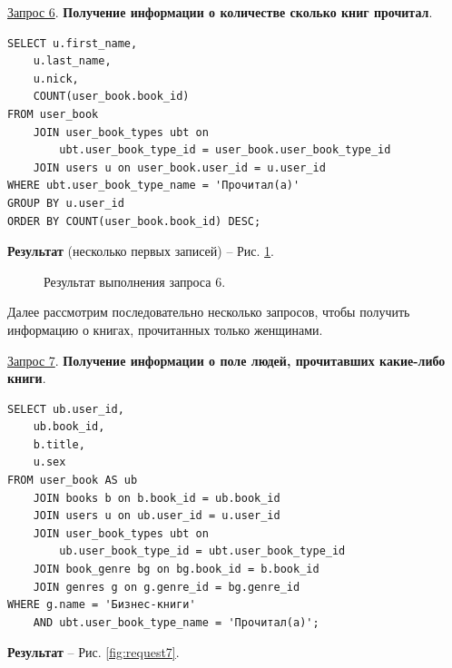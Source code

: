 \documentclass[a4paper,12pt]{article}
\begin{document}
\underline{Запрос 6}. \textbf{Получение информации о количестве сколько книг прочитал}.
\begin{lstlisting}
SELECT u.first_name,
    u.last_name,
    u.nick,
    COUNT(user_book.book_id)
FROM user_book
    JOIN user_book_types ubt on 
        ubt.user_book_type_id = user_book.user_book_type_id
    JOIN users u on user_book.user_id = u.user_id
WHERE ubt.user_book_type_name = 'Прочитал(а)'
GROUP BY u.user_id
ORDER BY COUNT(user_book.book_id) DESC;
    \end{lstlisting}

\textbf{Результат} (несколько первых записей) -- Рис. \ref{fig:request6}.

\begin{figure}[ht]
    \caption{Результат выполнения запроса 6.}
    \label{fig:request6}
\end{figure}

Далее рассмотрим последовательно несколько запросов, чтобы получить информацию о книгах, прочитанных только женщинами.

\underline{Запрос 7}. \textbf{Получение информации о поле людей, прочитавших какие-либо книги}.
\begin{lstlisting}
SELECT ub.user_id,
    ub.book_id,
    b.title,
    u.sex
FROM user_book AS ub
    JOIN books b on b.book_id = ub.book_id
    JOIN users u on ub.user_id = u.user_id
    JOIN user_book_types ubt on 
        ub.user_book_type_id = ubt.user_book_type_id
    JOIN book_genre bg on bg.book_id = b.book_id
    JOIN genres g on g.genre_id = bg.genre_id
WHERE g.name = 'Бизнес-книги'
    AND ubt.user_book_type_name = 'Прочитал(а)';
    \end{lstlisting}

\textbf{Результат} -- Рис. \ref{fig:request7}.
\end{document}
